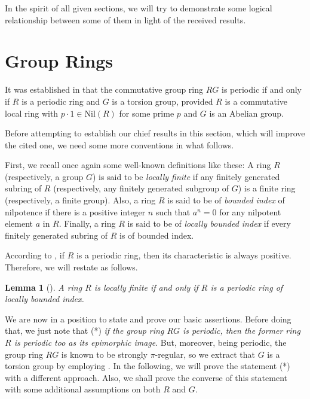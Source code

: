 \documentclass[12pt]{amsart}
\newtheorem{lem}[thm]{Lemma}
\theoremstyle{definition}
\theoremstyle{remark}
\numberwithin{equation}{section}
\begin{document}
In the spirit of all given sections, we will try to demonstrate some logical relationship between some of them in light of the received results.

\section{Group Rings} \label{SectionGroupRing}

\medskip

It was established in \cite[Theorem 1]{DanchevGroupRings} that the commutative group ring $RG$ is periodic if and only if $R$ is a periodic ring and $G$ is a torsion group, provided $R$ is a commutative local ring with $p\cdot 1\in \mathrm{Nil}(R)$ for some prime $p$ and $G$ is an Abelian group.

Before attempting to establish our chief results in this section, which will improve the cited one, we need some more conventions in what follows.

First, we recall once again some well-known definitions like these: A ring $R$ (respectively, a group $G$) is said to be {\it locally finite} if any finitely generated subring of $R$ (respectively, any finitely generated subgroup of $G$) is a finite ring (respectively, a finite group). Also, a ring $R$ is said to be of {\it bounded index} of nilpotence if there is a positive integer $n$ such that $a^n=0$ for any nilpotent element $a$ in $R$. Finally, a ring $R$ is said to be of {\it locally bounded index} if every finitely generated subring of $R$ is of bounded index.

According to \cite[Lemma 2.1]{BCL}, if $R$ is a periodic ring, then its characteristic is always positive. Therefore, we will restate \cite[Corollary 2]{Hirano} as follows.

\begin{lem}[{\cite[Corollary 2]{Hirano}}]\label{lemma3.1}
A ring $R$ is locally finite if and only if $R$ is a periodic ring of locally bounded index.
\end{lem}

We are now in a position to state and prove our basic assertions. Before doing that, we just note that (*) {\it if the group ring $RG$ is periodic, then the former ring $R$ is periodic too as its epimorphic image}. But, moreover, being periodic, the group ring $RG$ is known to be strongly $\pi$-regular, so we extract that $G$ is a torsion group by employing \cite[Proposition 3.4]{HV}. In the following, we will prove the statement (*) with a different approach. Also, we shall prove the converse of this statement with some additional assumptions on both $R$ and $G$.
\end{document}
